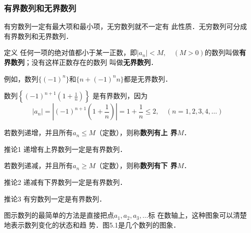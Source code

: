 \subsubsection{有界数列和无界数列}
有穷数列一定有最大项和最小项，无穷数列就不一定有
此性质．无穷数列可分成有界数列和无界数列．

\begin{blk}{定义}
任何一项的绝对值都小于某一正数，即$|a_n|<M,\quad (M>0)$的数列叫做\textbf{有界数列}；没有这样正数存在的数列
叫做\textbf{无界数列}．    
\end{blk}
 
例如，数列$\{(-1)^n\}$和$\{n+(-1)^n n\}$都是无界数列．

数列$\left\{(-1)^{n+1}\left(1+\frac{1}{n}\right)\right\}$
是有界数列，因为
\[|a_n|=\left|(-1)^{n+1}\left(1+\frac{1}{n}\right)\right|=1+\frac{1}{n}\le 2,\quad (n=1,
2,3,4,\ldots)\]

若数列递增，并且所有$a_n\le M$（定数），则称\textbf{数列有上
界}$M$．

\begin{blk}{推论1}
    递增有上界数列一定是有界数列．
\end{blk}

 若数列递减，并且所有$a_n\ge M$（定数），则称\textbf{数列有下
界}$M$．

\begin{blk}{推论2 }
    递减有下界数列一定是有界数列．
\end{blk}

\begin{blk}{推论3}
    有穷数列一定是有界数列．
\end{blk}

图示数列的最简单的方法是直接把点$a_1,a_2,a_3,\ldots$标
在数轴上，这种图象可以清楚地表示数列变化的状态和趋
势．图5.1是几个数列的图象．

